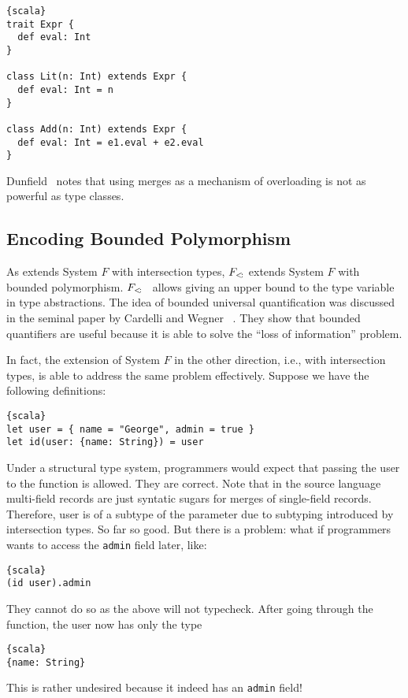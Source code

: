 
\begin{lstlisting}{scala}
trait Expr {
  def eval: Int
}

class Lit(n: Int) extends Expr {
  def eval: Int = n
}

class Add(n: Int) extends Expr {
  def eval: Int = e1.eval + e2.eval
}
\end{lstlisting}

Dunfield~\cite{dunfield2014elaborating} notes that using merges as a mechanism
of overloading is not as powerful as type classes.

\subsection{Encoding Bounded Polymorphism}

As \name extends System $ F $ with intersection types, $ F_{<\!:} $ extends
System $ F $ with bounded polymorphism. $ F_{<\!:} $~\cite{pierce2002types}
allows giving an upper bound to the type variable in type abstractions. The idea
of bounded universal quantification was discussed in the seminal paper by
Cardelli and Wegner ~\cite{cardelli1985understanding}. They show that bounded
quantifiers are useful because it is able to solve the ``loss of information''
problem.

In fact, the extension of System $ F $ in the other direction, i.e., with
intersection types, is able to address the same problem effectively. Suppose we
have the following definitions:
\begin{lstlisting}{scala}
let user = { name = "George", admin = true }
let id(user: {name: String}) = user
\end{lstlisting}
Under a structural type system, programmers would expect that passing the user
to the function is allowed. They are correct. Note that in the source language
multi-field records are just syntatic sugars for merges of single-field records.
Therefore, user is of a subtype of the parameter due to subtyping introduced by
intersection types. So far so good. But there is a problem: what if programmers
wants to access the \texttt{admin} field later, like:
\begin{lstlisting}{scala}
(id user).admin
\end{lstlisting}
They cannot do so as the above will not typecheck. After going through the
function, the user now has only the type
\begin{lstlisting}{scala}
{name: String}
\end{lstlisting}
This is rather undesired because it indeed has an \texttt{admin} field!

